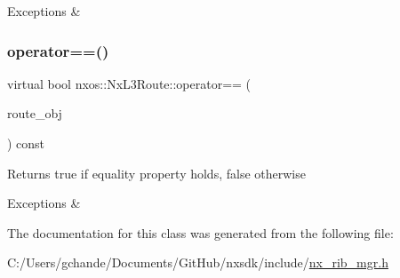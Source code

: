 \begin{DoxyCode}
\end{DoxyCode}



\begin{DoxyExceptions}{Exceptions}
{\em } & \\
\hline
\end{DoxyExceptions}
\mbox{\label{classnxos_1_1_nx_l3_route_a1680de6899caf8fa1be3ecfad131cd25}} 
\subsubsection{\texorpdfstring{operator==()}{operator==()}}
{\footnotesize\ttfamily virtual bool nxos\+::\+Nx\+L3\+Route\+::operator== (\begin{DoxyParamCaption}\item[{\mbox{\hyperlink{classnxos_1_1_nx_l3_route}{Nx\+L3\+Route}} const \&}]{route\+\_\+obj }\end{DoxyParamCaption}) const\hspace{0.3cm}{\ttfamily [pure virtual]}}

\begin{DoxyReturn}{Returns}
true if equality property holds, false otherwise
\end{DoxyReturn}

\begin{DoxyCode}
\end{DoxyCode}



\begin{DoxyExceptions}{Exceptions}
{\em } & \\
\hline
\end{DoxyExceptions}


The documentation for this class was generated from the following file\+:\begin{DoxyCompactItemize}
\item 
C\+:/\+Users/gchande/\+Documents/\+Git\+Hub/nxsdk/include/\mbox{\hyperlink{nx__rib__mgr_8h}{nx\+\_\+rib\+\_\+mgr.\+h}}\end{DoxyCompactItemize}
